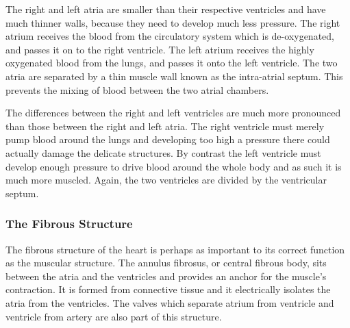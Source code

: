 The right and left atria are smaller than their respective ventricles and have
much thinner walls, because they need to develop much less pressure.  The right
atrium receives the blood from the circulatory system which is de-oxygenated,
and passes it on to the right ventricle.  The left atrium receives the highly
oxygenated blood from the lungs, and passes it onto the left ventricle.  The two
atria are separated by a thin muscle wall known as the intra-atrial septum.
This prevents the mixing of blood between the two atrial chambers.

The differences between the right and left ventricles are much more pronounced
than those between the right and left atria.  The right ventricle must merely
pump blood around the lungs and developing too high a pressure there could
actually damage the delicate structures.  By contrast the left ventricle must
develop enough pressure to drive blood around the whole body and as such it is
much more muscled.  Again, the two ventricles are divided by the ventricular
septum.

\subsubsection{The Fibrous Structure}

The fibrous structure of the heart is perhaps as important to its correct
function as the muscular structure.  The annulus fibrosus, or central fibrous
body, sits between the atria and the ventricles and provides an anchor for the
muscle's contraction.  It is formed from connective tissue and it electrically
isolates the atria from the ventricles.  The valves which separate atrium from
ventricle and ventricle from artery are also part of this structure.
